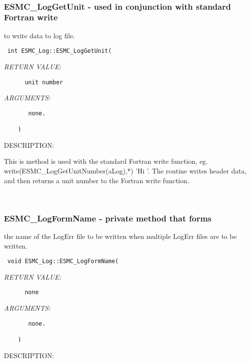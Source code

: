  
\mbox{}\hrulefill\ 
 
\subsubsection [ESMC\_LogGetUnit] {ESMC\_LogGetUnit - used in conjunction with standard Fortran write}


   to write data to log file. 
  
\begin{verbatim} int ESMC_Log::ESMC_LogGetUnit(\end{verbatim}{\em RETURN VALUE:}
\begin{verbatim}      unit number \end{verbatim}{\em ARGUMENTS:}
\begin{verbatim}       none.
 
    )\end{verbatim}
{\sf DESCRIPTION:\\ }


   This is method is
   used with the standard Fortran write function, eg.
   write(ESMC\_LogGetUnitNumber(aLog),*) 'Hi '. 
   The routine writes header data, and
   then returns a unit number to the Fortran write function.
   
 
\mbox{}\hrulefill\ 
 
\subsubsection [ESMC\_LogFormName] {ESMC\_LogFormName - private method that forms}


    the name of the LogErr file to be written when multiple LogErr
    files are to be written.
  
\begin{verbatim} 
 void ESMC_Log::ESMC_LogFormName(
 \end{verbatim}{\em RETURN VALUE:}
\begin{verbatim}      none\end{verbatim}{\em ARGUMENTS:}
\begin{verbatim}       none.
 
    )\end{verbatim}
{\sf DESCRIPTION:\\ }


